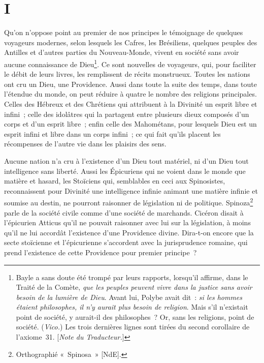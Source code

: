 \documentclass[french,twoside]{book} %
\begin{document}
\section[{I}]{I}
\noindent Qu’on n’oppose point au premier de nos principes le témoignage de quelques voyageurs modernes, selon lesquels les Cafres, les Brésiliens, quelques peuples des Antilles et d’autres parties du Nouveau-Monde, vivent en société sans avoir aucune  connaissance de Dieu\footnote{Bayle a sans doute été trompé par leurs rapports, lorsqu’il affirme, dans le Traité de la Comète, \emph{{\itshape que les peuples peuvent vivre dans la justice sans avoir besoin de la lumière de Dieu}}. Avant lui, Polybe avait dit : \emph{{\itshape si les hommes étaient philosophes, il n’y aurait plus besoin de religion}}. Mais s’il n’existait point de société, y aurait-il des philosophes ? Or, sans les religions, point de société. ({\itshape Vico.}) Les trois dernières lignes sont tirées du second corollaire de l’axiome 31. [{\itshape Note du Traducteur.}]}. Ce sont nouvelles de voyageurs, qui, pour faciliter le débit de leurs livres, les remplissent de récits monstrueux. Toutes les nations ont cru un Dieu, une Providence. Aussi dans toute la suite des temps, dans toute l’étendue du monde, on peut réduire à quatre le nombre des religions principales. Celles des Hébreux et des Chrétiens qui attribuent à la Divinité un esprit libre et infini ; celle des idolâtres qui la partagent entre plusieurs dieux composés d’un corps et d’un esprit libre ; enfin celle des Mahométans, pour lesquels Dieu est un esprit infini et libre dans un corps infini ; ce qui fait qu’ils placent les récompenses de l’autre vie dans les plaisirs des sens.\par
Aucune nation n’a cru à l’existence d’un Dieu tout matériel, ni d’un Dieu tout intelligence sans liberté. Aussi les Épicuriens qui ne voient dans le monde que matière et hasard, les Stoïciens qui, semblables en ceci aux Spinosistes, reconnaissent pour Divinité une intelligence infinie animant une matière infinie et soumise au destin, ne pourront raisonner de législation ni de politique. Spinoza\footnote{Orthographié « Spinosa » [NdE].} parle de la société civile comme d’une société de marchands. Cicéron disait à l’épicurien Atticus qu’il  ne pouvait raisonner avec lui sur la législation, à moins qu’il ne lui accordât l’existence d’une Providence divine. Dira-t-on encore que la secte stoïcienne et l’épicurienne s’accordent avec la jurisprudence romaine, qui prend l’existence de cette Providence pour premier principe ?
\end{document}
